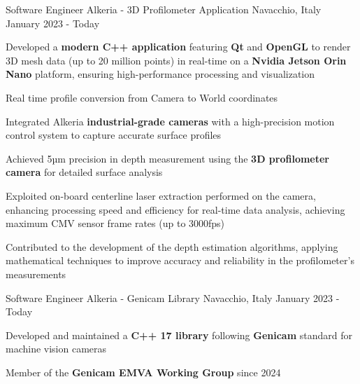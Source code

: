 

\begin{cventries}

  \cventry
    {Software Engineer} %
    {Alkeria - 3D Profilometer Application} %
    {Navacchio, Italy} %
    {January 2023 - Today} %
    {
      \begin{cvitems} %
        \item {Developed a \textbf{modern C++ application} featuring \textbf{Qt} and \textbf{OpenGL} to render 3D mesh data (up to 20 million points) in real-time on a \textbf{Nvidia Jetson Orin Nano} platform, ensuring high-performance processing and visualization}
        \item {Real time profile conversion from Camera to World coordinates}
        \item {Integrated Alkeria \textbf{industrial-grade cameras} with a high-precision motion control system to capture accurate surface profiles}
        \item {Achieved 5µm precision in depth measurement using the \textbf{3D profilometer camera} for detailed surface analysis}
        \item {Exploited on-board centerline laser extraction performed on the camera, enhancing processing speed and efficiency for real-time data analysis, achieving maximum CMV sensor frame rates (up to 3000fps)}
        \item {Contributed to the development of the depth estimation algorithms, applying mathematical techniques to improve accuracy and reliability in the profilometer's measurements}
      \end{cvitems}
    }

  \cventry
    {Software Engineer} %
    {Alkeria - Genicam Library} %
    {Navacchio, Italy} %
    {January 2023 - Today} %
    {
      \begin{cvitems} %
        \item {Developed and maintained a \textbf{C++ 17 library} following \textbf{Genicam} standard for machine vision cameras}
        \item {Member of the \textbf{Genicam EMVA Working Group} since 2024}
      \end{cvitems}
    }


\end{cventries}

